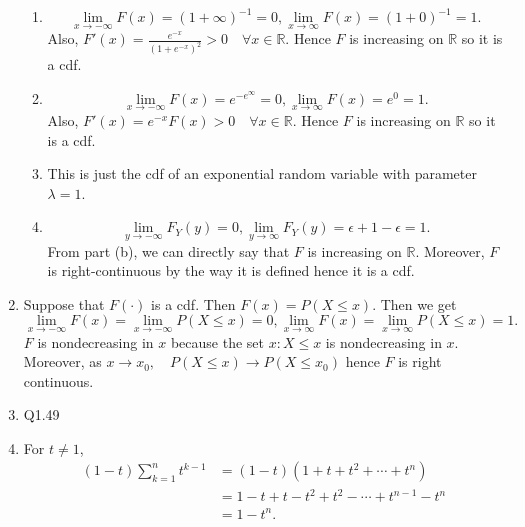 \documentclass{article}
\begin{document}
\begin{enumerate}
\begin{enumerate}
        \item \[ \lim_{x \to -\infty} F(x) = (1 + \infty)^{-1} = 0, 
        \lim_{x \to \infty} F(x) = (1 + 0)^{-1} = 1. \]
        Also, $F'(x) = \frac{e^{-x}}{(1 + e^{-x})^2} > 0 \quad \forall x \in \mathbb{R}$. 
        Hence $F$ is increasing on $\mathbb{R}$ so it is a cdf.

        \item \[ \lim_{x \to -\infty} F(x) = e^{-e^{\infty}} = 0, 
        \lim_{x \to \infty} F(x) = e^{0} = 1. \]
        Also, $F'(x) = e^{-x}F(x) > 0 \quad \forall x \in \mathbb{R}$. Hence $F$ is increasing 
        on $\mathbb{R}$ so it is a cdf.

        \item This is just the cdf of an exponential random variable with parameter $\lambda = 1$.
        
        \item \[ \lim_{y \to -\infty} F_{Y}(y) = 0, 
        \lim_{y \to \infty} F_{Y}(y) = \epsilon + 1 - \epsilon = 1. \]
        From part (b), we can directly say that $F$ is increasing on $\mathbb{R}$. Moreover, 
        $F$ is right-continuous by the way it is defined hence it is a cdf.
    \end{enumerate}

    \item Suppose that $F(\cdot)$ is a cdf. Then $F(x) = P(X \leq x)$. Then we get 
    \[ \lim_{x \to -\infty} F(x) = \lim_{x \to -\infty} P(X \leq x) = 0, 
    \lim_{x \to \infty} F(x) = \lim_{x \to \infty} P(X \leq x) = 1. \]
    $F$ is nondecreasing in $x$ because the set ${x: X \leq x}$ is nondecreasing in $x$. 
    Moreover, as $x \to x_0, \quad P(X \leq x) \to P(X \leq x_0)$ hence $F$ is right 
    continuous. 

    \item Q1.49

    \item For $t \neq 1$, 
    \begin{align*}
        (1 - t)\sum_{k = 1}^{n} t^{k - 1}
        &= (1 - t)(1 + t + t^2 + \cdots + t^n) \\
        &= 1 - t + t - t^2 + t^2 - \cdots + t^{n - 1} - t^{n} \\
        &= 1 - t^{n}.
    \end{align*}


\end{enumerate}
\end{document}
